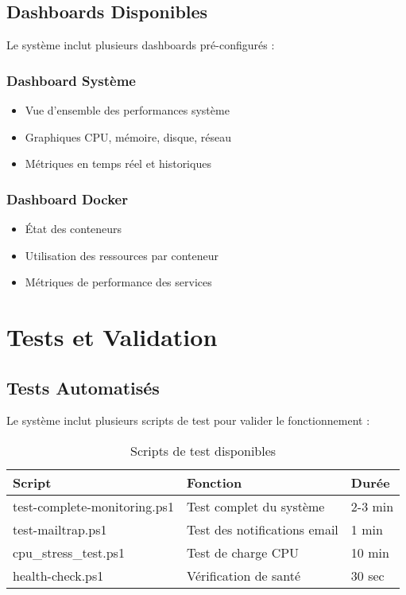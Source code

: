 \documentclass[12pt,a4paper]{report}
\begin{document}
\section{Dashboards Disponibles}

Le système inclut plusieurs dashboards pré-configurés :

\subsection{Dashboard Système}

\begin{itemize}
    \item Vue d'ensemble des performances système
    \item Graphiques CPU, mémoire, disque, réseau
    \item Métriques en temps réel et historiques
\end{itemize}

\subsection{Dashboard Docker}

\begin{itemize}
    \item État des conteneurs
    \item Utilisation des ressources par conteneur
    \item Métriques de performance des services
\end{itemize}

\chapter{Tests et Validation}

\section{Tests Automatisés}

Le système inclut plusieurs scripts de test pour valider le fonctionnement :

\begin{table}[H]
\centering
\begin{tabular}{|l|l|l|}
\hline
\textbf{Script} & \textbf{Fonction} & \textbf{Durée} \\
\hline
test-complete-monitoring.ps1 & Test complet du système & 2-3 min \\
\hline
test-mailtrap.ps1 & Test des notifications email & 1 min \\
\hline
cpu\_stress\_test.ps1 & Test de charge CPU & 10 min \\
\hline
health-check.ps1 & Vérification de santé & 30 sec \\
\hline
\end{tabular}
\caption{Scripts de test disponibles}
\label{tab:test-scripts}
\end{table}
\end{document}
